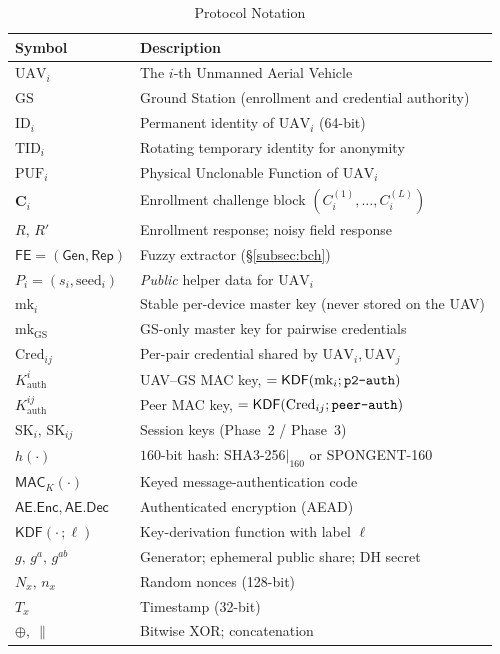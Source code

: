 \documentclass[11pt,a4paper]{article}
\begin{document}
\begin{table}[H]
\centering
\caption{Protocol Notation}
\label{tab:notation}
\begin{tabular}{@{}ll@{}}
\toprule
\textbf{Symbol} & \textbf{Description} \\
\midrule
$\text{UAV}_i$ & The $i$-th Unmanned Aerial Vehicle \\
$\text{GS}$ & Ground Station (enrollment and credential authority) \\
$\text{ID}_i$ & Permanent identity of $\text{UAV}_i$ (64-bit) \\
$\text{TID}_i$ & Rotating temporary identity for anonymity \\
$\text{PUF}_i$ & Physical Unclonable Function of $\text{UAV}_i$ \\
$\bm{C}_i$ & Enrollment challenge block $(C_i^{(1)},\dots,C_i^{(L)})$ \\
$R,\,R'$ & Enrollment response; noisy field response \\
$\mathsf{FE}=(\mathsf{Gen},\mathsf{Rep})$ & Fuzzy extractor (\S\ref{subsec:bch}) \\
$P_i=(s_i,\text{seed}_i)$ & \emph{Public} helper data for $\text{UAV}_i$ \\
$\text{mk}_i$ & Stable per-device master key (never stored on the UAV) \\
$\text{mk}_{\text{GS}}$ & GS-only master key for pairwise credentials \\
$\text{Cred}_{ij}$ & Per-pair credential shared by $\text{UAV}_i,\text{UAV}_j$ \\
$K^{i}_{\text{auth}}$ & UAV--GS MAC key, $=\mathsf{KDF}(\text{mk}_i;\texttt{p2\text{-}auth})$ \\
$K^{ij}_{\text{auth}}$ & Peer MAC key, $=\mathsf{KDF}(\text{Cred}_{ij};\texttt{peer\text{-}auth})$ \\
$\text{SK}_i,\,\text{SK}_{ij}$ & Session keys (Phase~2 / Phase~3) \\
$h(\cdot)$ & $160$-bit hash: SHA3-256$|_{160}$ or SPONGENT-160 \\
$\mathsf{MAC}_K(\cdot)$ & Keyed message-authentication code \\
$\mathsf{AE}.\mathsf{Enc},\mathsf{AE}.\mathsf{Dec}$ & Authenticated encryption (AEAD) \\
$\mathsf{KDF}(\cdot\,;\ell)$ & Key-derivation function with label $\ell$ \\
$g,\,g^{a},\,g^{ab}$ & Generator; ephemeral public share; DH secret \\
$N_x,\,n_x$ & Random nonces (128-bit) \\
$T_x$ & Timestamp (32-bit) \\
$\oplus,\ \|$ & Bitwise XOR; concatenation \\
\bottomrule
\end{tabular}
\end{table}
\end{document}
